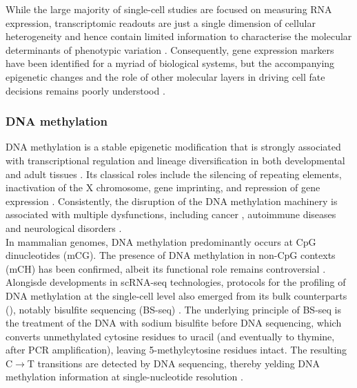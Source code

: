 While the large majority of single-cell studies are focused on measuring RNA expression, transcriptomic readouts are just a single dimension of cellular heterogeneity and hence contain limited information to characterise the molecular determinants of phenotypic variation \cite{Ritchie2015}. Consequently, gene expression markers have been identified for a myriad of biological systems, but the accompanying epigenetic changes and the role of other molecular layers in driving cell fate decisions remains poorly understood \cite{Griffiths2018,Kelsey2017,Bheda2014}.

\subsubsection{DNA methylation} \label{section:dna_methylation}
DNA methylation is a stable epigenetic modification that is strongly associated with transcriptional regulation and lineage diversification in both developmental and adult tissues \cite{Jin2018, Harrison2011, Lee2014, Smith2013}. Its classical roles include the silencing of repeating elements, inactivation of the X chromosome, gene imprinting, and repression of gene expression \cite{Jones2012}. Consistently, the disruption of the DNA methylation machinery is associated with multiple dysfunctions, including cancer \cite{Baylin2011}, autoimmune diseases \cite{Liu2013} and neurological disorders \cite{Amir1999}.\\
In mammalian genomes, DNA methylation predominantly occurs at CpG dinucleotides (mCG). The presence of DNA methylation in non-CpG contexts (mCH) has been confirmed, albeit its functional role remains controversial \cite{He2015, Ramsahoye2000, Lister2009}.\\

Alongisde developments in scRNA-seq technologies, protocols for the profiling of DNA methylation at the single-cell level also emerged from its bulk counterparts (), notably bisulfite sequencing (BS-seq) \cite{Smallwood2014,Guo2013,Gravina2016,Farlik2015}. The underlying principle of BS-seq is the treatment of the DNA with sodium bisulfite before DNA sequencing, which converts unmethylated cytosine residues to uracil (and eventually to thymine, after PCR amplification), leaving 5-methylcytosine residues intact. The resulting C$\to$T transitions are detected by DNA sequencing, thereby yelding DNA methylation information at single-nucleotide resolution \cite{Frommer1992,Clark2016,Clark2017}.

